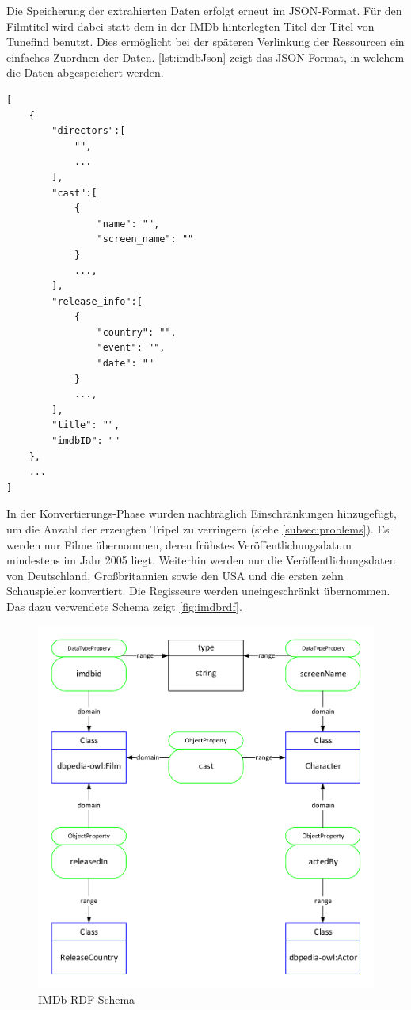\documentclass[parskip]{scrartcl}
\begin{document}
Die Speicherung der extrahierten Daten erfolgt erneut im JSON-Format. Für den Filmtitel wird dabei statt dem in der IMDb hinterlegten Titel der Titel von Tunefind benutzt. Dies ermöglicht bei der späteren Verlinkung der Ressourcen ein einfaches Zuordnen der Daten. \autoref{lst:imdbJson} zeigt das JSON-Format, in welchem die Daten abgespeichert werden.

\begin{lstlisting}[caption={IMDb JSON-Format}, label={lst:imdbJson}]
[  
    {  
        "directors":[  
            "",
            ...
        ],
        "cast":[
            {
                "name": "",
                "screen_name": ""
            }
            ...,
        ],
        "release_info":[
            {
                "country": "",
                "event": "",
                "date": ""
            }
            ...,
        ],
        "title": "",
        "imdbID": ""
    },
    ...
]
\end{lstlisting}

In der Konvertierungs-Phase wurden nachträglich Einschränkungen hinzugefügt, um die Anzahl der erzeugten Tripel zu verringern (siehe \ref{subsec:problems}). Es werden nur Filme übernommen, deren frühstes Veröffentlichungsdatum mindestens im Jahr 2005 liegt. Weiterhin werden nur die Veröffentlichungsdaten von Deutschland, Großbritannien sowie den USA und die ersten zehn Schauspieler konvertiert. Die Regisseure werden uneingeschränkt übernommen. Das dazu verwendete Schema zeigt \autoref{fig:imdbrdf}.

\begin{figure}[H]
    \centering
    \caption{IMDb RDF Schema}
    \label{fig:imdbrdf}
    \includegraphics[scale=0.8]{imdb}
\end{figure}
\end{document}
